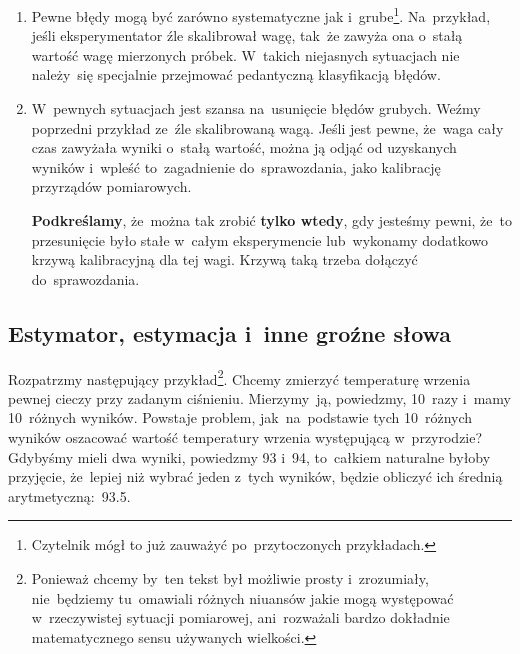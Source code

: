 \documentclass[a4paper,11pt]{article}
\begin{document}
\begin{enumerate}
\item Pewne błędy mogą być zarówno systematyczne jak
  i~grube\footnote{Czytelnik mógł to już zauważyć po~przytoczonych
    przykładach.}. Na~przykład, jeśli eksperymentator źle skalibrował
  wagę, tak~że zawyża ona o~stałą wartość wagę mierzonych próbek.
  W~takich niejasnych sytuacjach nie należy~się specjalnie przejmować
  pedantyczną klasyfikacją błędów.
  
\item W~pewnych sytuacjach jest szansa na~usunięcie błędów grubych.
  Weźmy poprzedni przykład ze~źle skalibrowaną wagą. Jeśli jest pewne,
  że~waga cały czas zawyżała wyniki o~stałą wartość, można ją odjąć od
  uzyskanych wyników i~wpleść to~zagadnienie do~sprawozdania, jako
  kalibrację przyrządów pomiarowych.

  \textbf{Podkreślamy}, że~można tak zrobić \textbf{tylko wtedy}, gdy
  jesteśmy pewni, że~to przesunięcie było stałe w~całym eksperymencie
  lub~wykonamy dodatkowo krzywą kalibracyjną dla tej wagi. Krzywą taką
  trzeba dołączyć do~sprawozdania.
\end{enumerate}





\subsection{Estymator, estymacja i~inne groźne słowa}
\label{sec:estymator}

Rozpatrzmy następujący przykład\footnote{Ponieważ chcemy by~ten tekst
  był możliwie prosty i~zrozumiały, nie~będziemy tu~omawiali różnych
  niuansów jakie mogą występować w~rzeczywistej sytuacji pomiarowej,
  ani~rozważali bardzo dokładnie matematycznego sensu używanych
  wielkości.}. Chcemy zmierzyć temperaturę wrzenia pewnej cieczy przy
zadanym ciśnieniu. Mierzymy~ją, powiedzmy, 10~razy i~mamy 10~różnych
wyników. Powstaje problem, jak~na~podstawie tych 10~różnych wyników
oszacować wartość temperatury wrzenia występującą w~przyrodzie?
Gdybyśmy mieli dwa wyniki, powiedzmy 93\textcelsius{}
i~94\textcelsius, to~całkiem naturalne byłoby przyjęcie, że~lepiej niż
wybrać jeden z~tych wyników, będzie obliczyć ich średnią
arytmetyczną:~93.5\textcelsius.
\end{document}
